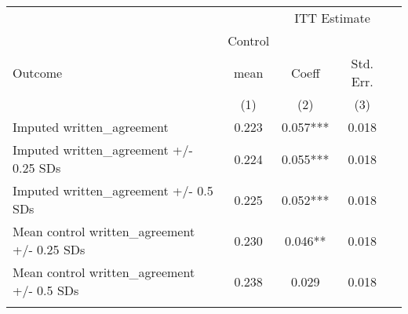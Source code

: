 \begin{tabular}{lcccc}
\hline \noalign{\smallskip} &  & \multicolumn{2}{c}{{ ITT Estimate}} & \\
\cline{3-4} & Control &  &  & \\
Outcome & mean & Coeff & Std. Err. & \\
 & (1) & (2) & (3) & \\
\noalign{\smallskip}\hline \noalign{\smallskip}Imputed written\_agreement & 0.223 & 0.057*** & 0.018 & \\
Imputed written\_agreement +/- 0.25 SDs & 0.224 & 0.055*** & 0.018 & \\
Imputed written\_agreement +/- 0.5 SDs & 0.225 & 0.052*** & 0.018 & \\
Mean control written\_agreement +/- 0.25 SDs & 0.230 & 0.046** & 0.018 & \\
Mean control written\_agreement +/- 0.5 SDs & 0.238 & 0.029 & 0.018 & \\
\noalign{\smallskip}\hline\end{tabular}\\
